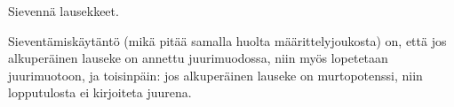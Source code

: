 \begin{esimerkki}
Sievennä lausekkeet.
	\begin{esimratk}
 	\end{esimratk}
\end{esimerkki}

Sieventämiskäytäntö (mikä pitää samalla huolta määrittelyjoukosta) on, että jos alkuperäinen lauseke on annettu juurimuodossa, niin myös lopetetaan juurimuotoon, ja toisinpäin: jos alkuperäinen lauseke on murtopotenssi, niin lopputulosta ei kirjoiteta juurena.

